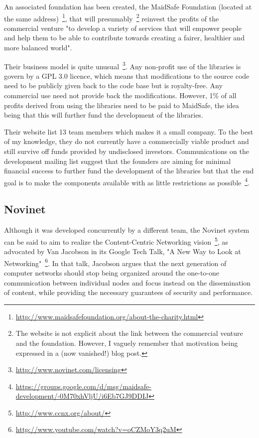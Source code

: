 An associated foundation has been created, the MaidSafe Foundation (located at the same address)~\footnote{\url{http://www.maidsafefoundation.org/about-the-charity.html}}, that will presumably~\footnote{The website is not explicit about the link between the commercial venture and the foundation. However, I vaguely remember that motivation being expressed in a (now vanished!) blog post.} reinvest the profits of the commercial venture "to develop a variety of services that will empower people and help them to be able to contribute towards creating a fairer, healthier and more balanced world".

Their business model is quite unusual~\footnote{\url{http://www.novinet.com/licensing}}. Any non-profit use of the libraries is govern by a GPL 3.0 licence, which means that modifications to the source code need to be publicly given back to the code base but is royalty-free. Any commercial use need not provide back the modifications. However, 1\% of all profits derived from using the libraries need to be paid to MaidSafe, the idea being that this will further fund the development of the libraries.

Their website list 13 team members which makes it a small company. To the best of my knowledge, they do not currently have a commercially viable product and still survive off funds provided by undisclosed investors. Communications on the development mailing list suggest that the founders are aiming for minimal financial success to further fund the development of the libraries but that the end goal is to make the components available with as little restrictions as possible~\footnote{\url{https://groups.google.com/d/msg/maidsafe-development/-0M70xhVljU/i6Eb7GJ9DDIJ}}.

\subsection{Novinet}

Although it was developed concurrently by a different team, the Novinet system can be said to aim to realize the Content-Centric Networking vision~\footnote{\url{http://www.ccnx.org/about/}}, as advocated by Van Jacobson in its Google Tech Talk, "A New Way to Look at Networking"~\footnote{\url{http://www.youtube.com/watch?v=oCZMoY3q2uM}}. In that talk, Jacobson argues that the next generation of computer networks should stop being organized around the one-to-one communication between individual nodes and focus instead on the dissemination of content, while providing the necessary guarantees of security and performance.

